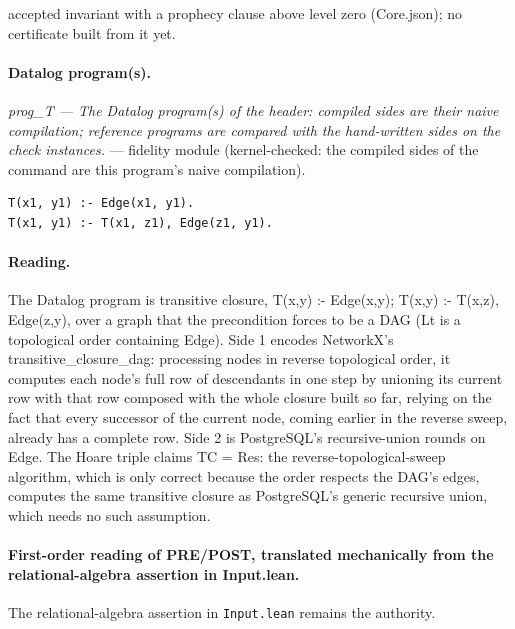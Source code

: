 \documentclass[10pt]{article}
\begin{document}
\begin{description}[leftmargin=2.6cm,style=nextline,itemsep=1pt]
\item[Prophecy] accepted invariant with a prophecy clause above level zero (Core.json); no certificate built from it yet.

\end{description}

\paragraph{Datalog program(s).}

{\raggedright\textit{prog\_T --- The Datalog program(s) of the header: compiled sides are their naive compilation; reference programs are compared with the hand-written sides on the check instances.} --- fidelity module (kernel-checked: the compiled sides of the command are this program's naive compilation).\par}

\begin{Verbatim}[fontsize=\scriptsize,breaklines=true,breakanywhere=true,frame=single,framesep=1.5mm]
T(x1, y1) :- Edge(x1, y1).
T(x1, y1) :- T(x1, z1), Edge(z1, y1).
\end{Verbatim}

\paragraph{Reading.} The Datalog program is transitive closure, T(x,y) :- Edge(x,y); T(x,y) :- T(x,z), Edge(z,y), over a graph that the precondition forces to be a DAG (Lt is a topological order containing Edge). Side 1 encodes NetworkX's transitive\_closure\_dag: processing nodes in reverse topological order, it computes each node's full row of descendants in one step by unioning its current row with that row composed with the whole closure built so far, relying on the fact that every successor of the current node, coming earlier in the reverse sweep, already has a complete row. Side 2 is PostgreSQL's recursive-union rounds on Edge. The Hoare triple claims TC = Res: the reverse-topological-sweep algorithm, which is only correct because the order respects the DAG's edges, computes the same transitive closure as PostgreSQL's generic recursive union, which needs no such assumption.

\paragraph{First-order reading of PRE/POST, translated mechanically from the relational-algebra assertion in Input.lean.} The relational-algebra assertion in \texttt{Input.lean} remains the authority.
\end{document}
